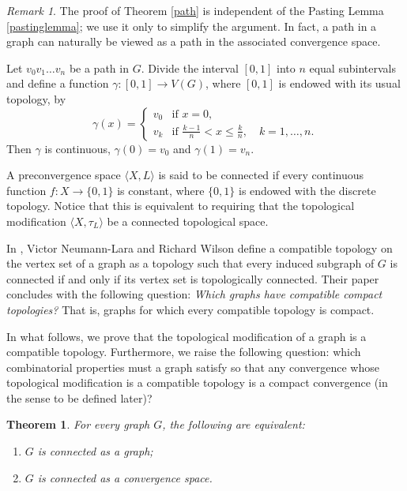 \documentclass{amsart}
\newtheorem{theorem}{Theorem}[section]
\theoremstyle{definition}
\theoremstyle{remark}
\newtheorem{remark}{Remark}[section]
\numberwithin{equation}{section}
\begin{document}
	\begin{remark}
		\label{repath}
		The proof of Theorem \ref{path} is independent of the Pasting Lemma \ref{pastinglemma}; we use it only to simplify the argument. In fact, a path in a graph can naturally be viewed as a path in the associated convergence space.
		
		Let $v_0v_1\dots v_n$ be a path in $G$. Divide the interval $[0,1]$ into $n$ equal subintervals and define a function $\gamma:[0,1]\to V(G)$, where $[0,1]$ is endowed with its usual topology, by
		\[
		\gamma(x)=
		\begin{cases}
			v_0 & \text{if } x=0,\\
			v_k & \text{if } \frac{k-1}{n} < x \le \frac{k}{n}, \quad k=1,\dots,n.
		\end{cases}
		\]
		Then $\gamma$ is continuous, $\gamma(0)=v_0$ and $\gamma(1)=v_n$.
	\end{remark}


A preconvergence space $\langle X, L \rangle$ is said to be connected if every continuous function $f : X \to \{0,1\}$ is constant, where $\{0,1\}$ is endowed with the discrete topology. Notice that this is equivalent to requiring that the topological modification $\langle X, \tau_L \rangle$ be a connected topological space.

In \cite{NeumannLaraWilson1995}, Victor Neumann-Lara and Richard Wilson define a compatible topology on the vertex set of a graph as a topology such that every induced subgraph of $G$ is connected if and only if its vertex set is topologically connected. Their paper concludes with the following question: \textit{Which graphs have compatible compact topologies?} That is, graphs for which every compatible topology is compact.

In what follows, we prove that the topological modification of a graph is a compatible topology. Furthermore, we raise the following question: which combinatorial properties must a graph satisfy so that any convergence whose topological modification is a compatible topology is a compact convergence (in the sense to be defined later)?



\begin{theorem}
	\label{connected}
	For every graph $G$, the following are equivalent:
	\begin{enumerate}
		\item $G$ is connected as a graph;
		\item $G$ is connected as a convergence space.
	\end{enumerate}
\end{theorem}
\end{document}
